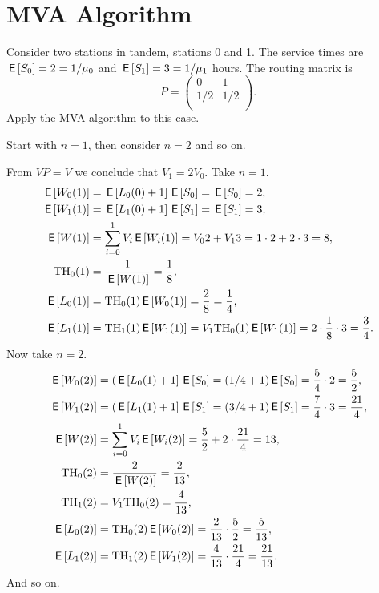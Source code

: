 
\section{MVA Algorithm}
\label{sec:mva}



\begin{exercise}
 Consider two stations in tandem, stations 0 and 1. The service times
 are $\E{ S_0} = 2=1/\mu_0$ and $\E{ S_1} = 3=1/\mu_1$ hours. The routing matrix is
 \begin{equation*}
 P=
 \begin{pmatrix}
 0 & 1\\
1/2 & 1/2\\
 \end{pmatrix}.
 \end{equation*}
Apply the MVA algorithm to this case.
\begin{hint}
Start with $n=1$, then consider $n=2$ and so on.
\end{hint}
\begin{solution}
 From $V P = V$ we conclude that $V_1=2V_0$. Take $n=1$.
 \begin{align*}
\E{ W_0(1)} &= \E{ L_0(0)+1}\E{ S_0} = \E{ S_0 }= 2,\\
 \E{ W_1(1)} &= \E{ L_1(0)+1}\E{ S_1} = \E{ S_1} = 3,\\
 \E{ W(1)} &= \sum_{i=0}^1 V_i \E{ W_i(1)} = V_0 2 + V_1 3 = 1\cdot 2 + 2 \cdot 3 = 8,\\
 \TH_0(1) &= \frac{1}{\E{ W(1)}} = \frac18, \\
 \E{ L_0(1)} &= \TH_0(1) \E{ W_0(1)} = \frac28=\frac14, \\
 \E{ L_1(1)} &= \TH_1(1) \E{ W_1(1)} = V_1 \TH_0(1) \E{ W_1(1)}= 2 \cdot \frac18 \cdot 3 = \frac34.\\
 \end{align*}
Now take $n=2$. 
 \begin{align*}
\E{ W_0(2) }&= (\E{ L_0(1)+1}\E{ S_0}= (1/4+1)\E{ S_0} = \frac54\cdot2=\frac52,\\
\E{ W_1(2) }&= (\E{ L_1(1)+1}\E{ S_1} = (3/4+1)\E{ S_1} = \frac74\cdot3=\frac{21}4,\\
\E{ W(2) }&= \sum_{i=0}^1 V_i \E{ W_i(2)} = \frac52 + 2 \cdot \frac{21}4=13,\\
\TH_0(2) &= \frac{2}{\E{ W(2)}} = \frac2{13}, \\
\TH_1(2) &= V_1 \TH_0(2) = \frac4{13}, \\
\E{ L_0(2)} &= \TH_0(2) \E{ W_0(2)} = \frac2{13}\cdot \frac52=\frac5{13}, \\
\E{ L_1(2)} &= \TH_1(2) \E{ W_1(2)} = \frac{4}{13} \cdot \frac{21}{4} = \frac{21}{13}.\\
 \end{align*}
And so on.
\end{solution}
\end{exercise}


